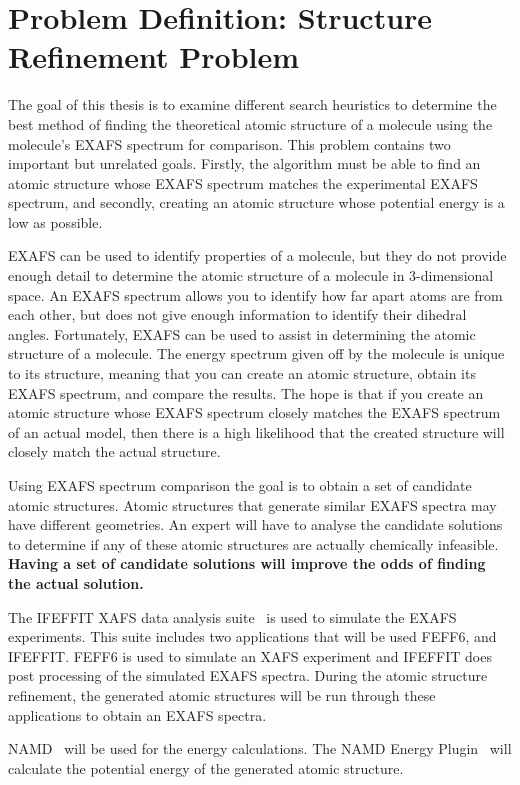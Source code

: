 \section{Problem Definition: Structure Refinement Problem}
\label{sec:problem-definition}

The goal of this thesis is to examine different search heuristics to determine the best method of finding the theoretical atomic structure of a molecule using the molecule's EXAFS spectrum for comparison. This problem contains two important but unrelated goals. Firstly, the algorithm must be able to find an atomic structure whose EXAFS spectrum matches the experimental EXAFS spectrum, and secondly, creating an atomic structure whose potential energy is a low as possible.

EXAFS can be used to identify properties of a molecule, but they do not provide enough detail to determine the atomic structure of a molecule in 3-dimensional space. An EXAFS spectrum allows you to identify how far apart atoms are from each other, but does not give enough information to identify their dihedral angles. Fortunately, EXAFS can be used to assist in determining the atomic structure of a molecule. The energy spectrum given off by the molecule is unique to its structure, meaning that you can create an atomic structure, obtain its EXAFS spectrum, and compare the results. The hope is that if you create an atomic structure whose EXAFS spectrum closely matches the EXAFS spectrum of an actual model, then there is a high likelihood that the created structure will closely match the actual structure.

Using EXAFS spectrum comparison the goal is to obtain a set of candidate atomic structures. Atomic structures that generate similar EXAFS spectra may have different geometries. An expert will have to analyse the candidate solutions to determine if any of these atomic structures are actually chemically infeasible. \textbf{Having a set of candidate solutions will improve the odds of finding the actual solution.}

The IFEFFIT XAFS data analysis suite~\cite{ifeffit} is used to simulate the EXAFS experiments. This suite includes two applications that will be used FEFF6, and IFEFFIT. FEFF6 is used to simulate an XAFS experiment and IFEFFIT does post processing of the simulated EXAFS spectra. During the atomic structure refinement, the generated atomic structures will be run through these applications to obtain an EXAFS spectra.

NAMD~\cite{namd} will be used for the energy calculations. The NAMD Energy Plugin~\cite{namdEnergy}  will calculate the potential energy of the generated atomic structure.

